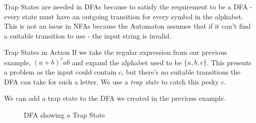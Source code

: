 Trap States are needed in DFAs because to satisfy the requirement to be a DFA - every state must have an outgoing transition for every symbol in the alphabet. This is not an issue in NFAs because the Automaton assumes that if it can't find a suitable transition to use - the input string is invalid.


\begin{example}{Trap States in Action}
If we take the regular expression from our previous example, $(a+b)^*ab$ and expand the alphabet used to be $\{a, b, c\}$. This presents a problem as the input could contain $c$, but there's no suitable transitions the DFA can take for such a letter. We use a \textit{trap state} to catch this pesky $c$.

We can add a trap state to the DFA we created in the previous example. 

\begin{figure}[H]
    \centering
    \caption{DFA showing a Trap State}
    \label{fig:dfa-showing-trap-state}
\end{figure}
\end{example}